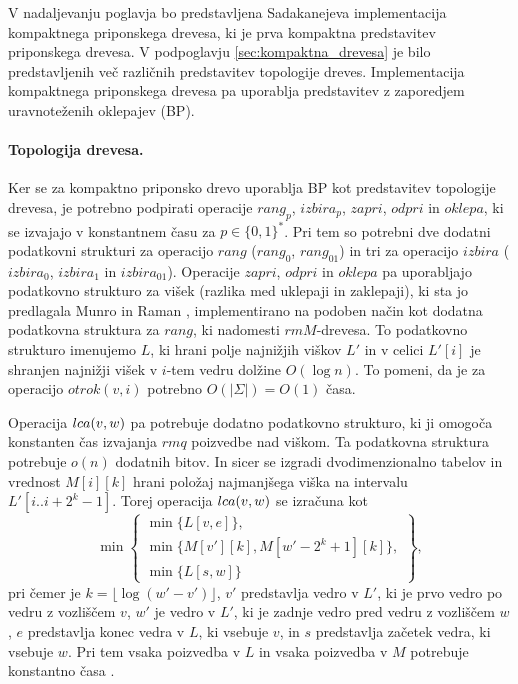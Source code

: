 V nadaljevanju poglavja bo predstavljena Sadakanejeva \cite{Sadakane2007} implementacija kompaktnega priponskega drevesa, ki je prva kompaktna predstavitev priponskega drevesa. V podpoglavju \ref{sec:kompaktna_drevesa} je bilo predstavljenih več različnih predstavitev topologije dreves. Implementacija kompaktnega priponskega drevesa pa uporablja predstavitev z zaporedjem uravnoteženih oklepajev (BP).

\paragraph{Topologija drevesa.}
Ker se za kompaktno priponsko drevo uporablja BP kot predstavitev topologije drevesa, je potrebno podpirati operacije $rang_p$, $izbira_p$, $zapri$, $odpri$ in $oklepa$, ki se izvajajo v konstantnem času za $p\in\{0,1\} ^*$. Pri tem so potrebni dve dodatni podatkovni strukturi za operacijo $rang$ ($rang_0$, $rang_{01}$) in tri za operacijo $izbira$ ($izbira_0$, $izbira_1$ in $izbira_{01}$). Operacije $zapri$, $odpri$ in $oklepa$ pa uporabljajo podatkovno strukturo za višek (razlika med uklepaji in zaklepaji), ki sta jo predlagala Munro in Raman \cite{Munro1997}, implementirano na podoben način kot dodatna podatkovna struktura za $rang$, ki nadomesti $rmM$-drevesa. To podatkovno strukturo imenujemo $L$, ki hrani polje najnižjih viškov $L'$ in v celici $L'[i]$ je shranjen najnižji višek v $i$-tem vedru dolžine $O(\log{n})$. To pomeni, da je za operacijo $otrok(v,i)$ potrebno $O(|\Sigma|)=O(1)$ časa. 

Operacija $ \mathop{lca}(v,w) $ pa potrebuje dodatno podatkovno strukturo, ki ji omogoča konstanten čas izvajanja $rmq$ poizvedbe nad viškom. Ta podatkovna struktura potrebuje $o(n)$ dodatnih bitov. In sicer se izgradi dvodimenzionalno tabelov in vrednost $M[i][k]$ hrani položaj najmanjšega viška na intervalu $L'[i..i+2^k-1]$. Torej operacija $ \mathop{lca}(v,w) $ se izračuna kot
\begin{equation*}
    \min\left\{
    \begin{array}{l}
        \min\{L[v,e]\},\\ 
        \min\{M[v'][k],M[w'-2^k+1][k]\},\\
        \min\{L[s,w]\}
    \end{array}\right\},
\end{equation*}
pri čemer je $k=\lfloor \log{(w'-v')\rfloor}$, $v'$ predstavlja vedro v $L'$, ki je prvo vedro po vedru z vozliščem $v$, $w'$ je vedro v $L'$, ki je zadnje vedro pred vedru z vozliščem $w$, $e$ predstavlja konec vedra v $L$, ki vsebuje $v$, in $s$ predstavlja začetek vedra, ki vsebuje $w$. Pri tem vsaka poizvedba v $L$ in vsaka poizvedba v $M$ potrebuje konstantno časa \cite{Sadakane2007,Valimaki2007}. 

